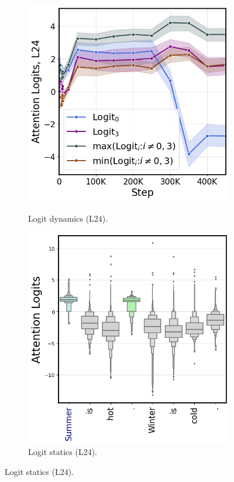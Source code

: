 \begin{figure}[thp]
    \centering
    \hfill
    \begin{subfigure}[t]{0.32\textwidth}
        \centering 
        \caption{\small Logit dynamics (L24).}
        \includegraphics[width=\textwidth]{Figures/olmo/olmo_logits.png}
        \label{fig:attention_logits_olmo_dynamic}
    \end{subfigure}
    \hfill
    \begin{subfigure}[t]{0.32\textwidth}
        \centering 
        \caption{\small Logit statics (L24).}
        \includegraphics[width=\textwidth]{Figures/olmo/olmo_logits_static.png}

\end{subfigure}
\end{figure}
